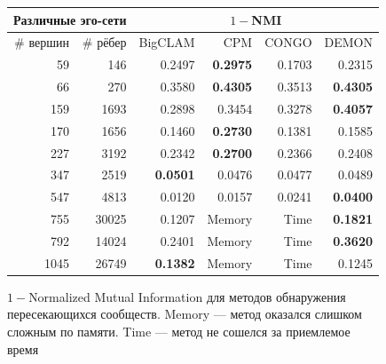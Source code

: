 \documentclass[12pt]{article}
\begin{document}
\begin{figure}[h]
\begin{center}
\begin{tabular}{rr|rrrr}
\hline
\multicolumn{2}{c|}{Различные эго-сети} & \multicolumn{4}{c}{$1 -$NMI}\\
\hline
 \# вершин &  \# рёбер &  BigCLAM &     CPM &   CONGO &   DEMON \\
\hline
       59 &    146 &   0.2497 &  \bf{0.2975} &  0.1703 &  0.2315 \\
       66 &    270 &   0.3580 &  \bf{0.4305} &  0.3513 &  \bf{0.4305} \\
      159 &   1693 &   0.2898 &  0.3454 &  0.3278 &  \bf{0.4057} \\
      170 &   1656 &   0.1460 &  \bf{0.2730} &  0.1381 &  0.1585 \\
      227 &   3192 &   0.2342 &  \bf{0.2700} &  0.2366 &  0.2408 \\
      347 &   2519 &   \bf{0.0501} &  0.0476 &  0.0477 &  0.0489 \\
      547 &   4813 &   0.0120 &  0.0157 &  0.0241 &  \bf{0.0400} \\
      755 &  30025 &   0.1207 &  Memory &  Time &  \bf{0.1821} \\
      792 &  14024 &   0.2401 &  Memory &  Time &  \bf{0.3620} \\
     1045 &  26749 &   \bf{0.1382} &  Memory &  Time &  0.1245 \\
\hline
\end{tabular}
\caption{$1 -$Normalized Mutual Information для методов обнаружения пересекающихся сообществ. Memory --- метод оказался слишком сложным по памяти. Time --- метод не сошелся за приемлемое время \label{fig::nmi_overlap}}
\end{center}
\end{figure}
\end{document}
